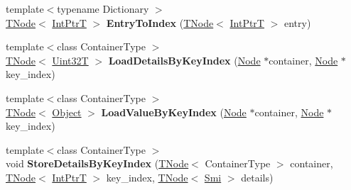 \begin{DoxyCompactItemize}
\item 
\mbox{\label{classv8_1_1internal_1_1CodeStubAssembler_a6eec72b4247053667fa280553cf7b74e}} 
{\footnotesize template$<$typename Dictionary $>$ }\\\mbox{\hyperlink{classv8_1_1internal_1_1compiler_1_1TNode}{T\+Node}}$<$ \mbox{\hyperlink{structv8_1_1internal_1_1IntPtrT}{Int\+PtrT}} $>$ {\bfseries Entry\+To\+Index} (\mbox{\hyperlink{classv8_1_1internal_1_1compiler_1_1TNode}{T\+Node}}$<$ \mbox{\hyperlink{structv8_1_1internal_1_1IntPtrT}{Int\+PtrT}} $>$ entry)
\item 
\mbox{\label{classv8_1_1internal_1_1CodeStubAssembler_ace2c36f4358d123500fdfe1d4d464a2e}} 
{\footnotesize template$<$class Container\+Type $>$ }\\\mbox{\hyperlink{classv8_1_1internal_1_1compiler_1_1TNode}{T\+Node}}$<$ \mbox{\hyperlink{structv8_1_1internal_1_1Uint32T}{Uint32T}} $>$ {\bfseries Load\+Details\+By\+Key\+Index} (\mbox{\hyperlink{classv8_1_1internal_1_1compiler_1_1Node}{Node}} $\ast$container, \mbox{\hyperlink{classv8_1_1internal_1_1compiler_1_1Node}{Node}} $\ast$key\+\_\+index)
\item 
\mbox{\label{classv8_1_1internal_1_1CodeStubAssembler_ace8de4c9e51f4b0fb8d908472493ccac}} 
{\footnotesize template$<$class Container\+Type $>$ }\\\mbox{\hyperlink{classv8_1_1internal_1_1compiler_1_1TNode}{T\+Node}}$<$ \mbox{\hyperlink{classv8_1_1internal_1_1Object}{Object}} $>$ {\bfseries Load\+Value\+By\+Key\+Index} (\mbox{\hyperlink{classv8_1_1internal_1_1compiler_1_1Node}{Node}} $\ast$container, \mbox{\hyperlink{classv8_1_1internal_1_1compiler_1_1Node}{Node}} $\ast$key\+\_\+index)
\item 
\mbox{\label{classv8_1_1internal_1_1CodeStubAssembler_a94d6b1c3520f6f6a8f54d34fd524af61}} 
{\footnotesize template$<$class Container\+Type $>$ }\\void {\bfseries Store\+Details\+By\+Key\+Index} (\mbox{\hyperlink{classv8_1_1internal_1_1compiler_1_1TNode}{T\+Node}}$<$ Container\+Type $>$ container, \mbox{\hyperlink{classv8_1_1internal_1_1compiler_1_1TNode}{T\+Node}}$<$ \mbox{\hyperlink{structv8_1_1internal_1_1IntPtrT}{Int\+PtrT}} $>$ key\+\_\+index, \mbox{\hyperlink{classv8_1_1internal_1_1compiler_1_1TNode}{T\+Node}}$<$ \mbox{\hyperlink{classv8_1_1internal_1_1Smi}{Smi}} $>$ details)

\end{DoxyCompactItemize}
